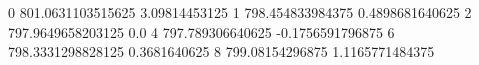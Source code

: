 0 801.0631103515625 3.09814453125
1 798.454833984375 0.4898681640625
2 797.9649658203125 0.0
4 797.789306640625 -0.1756591796875
6 798.3331298828125 0.3681640625
8 799.08154296875 1.1165771484375
